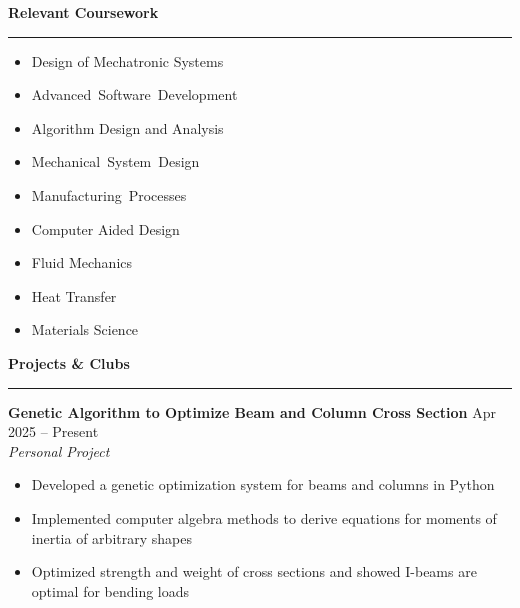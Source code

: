 \documentclass[a4paper,10pt]{article}
\newcommand{\sectionline}{\noindent\rule{\linewidth}{1pt}\vspace{-0.5em}}  %
\begin{document}
\textbf{\large Relevant Coursework} \vspace{-1em}\\
\sectionline
\vspace{-0.5em}
\begin{multicols}{3}
    \begin{itemize}[noitemsep, topsep=0pt]
        \item Design of Mechatronic Systems
        \item \mbox{Advanced Software Development}
        \item Algorithm Design and Analysis
    \end{itemize}
    
    \columnbreak
    
    \begin{itemize}[noitemsep, topsep=0pt, left=30pt]
        \item \mbox{Mechanical System Design}
        \item \mbox{Manufacturing Processes}
        \item Computer Aided Design
    \end{itemize}
    
    \columnbreak
    
    \begin{itemize}[noitemsep, topsep=0pt, left=30pt]
        \item Fluid Mechanics
        \item Heat Transfer
        \item Materials Science
    \end{itemize}
\end{multicols}
\vspace{-1em}





\textbf{\large Projects \& Clubs} \vspace{-1em}\\
\sectionline

\textbf{Genetic Algorithm to Optimize Beam and Column Cross Section} \hfill Apr 2025 -- Present \\
\emph{Personal Project}
\begin{itemize}[noitemsep, topsep=0pt]
    \item Developed a genetic optimization system for beams and columns in Python
    \item Implemented computer algebra methods to derive equations for moments of inertia of arbitrary shapes
    \item Optimized strength and weight of cross sections and showed I-beams are optimal for bending loads
    
\end{itemize}
\end{document}
